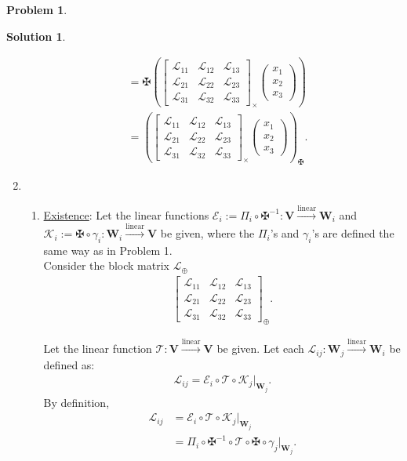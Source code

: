 \documentclass{article}
\theoremstyle{definition}
\newtheorem*{prob*}{Problem}
\newtheorem*{sln*}{Solution}
\newcommand{\V}{\mathbf{V}}
\newcommand{\W}{\mathbf{W}}
\newcommand{\lag}{\mathcal{L}}
\newcommand{\K}{\mathcal{K}}
\newcommand{\E}{\mathcal{E}}
\newcommand{\lin}{\overset{\text{linear}}{\longrightarrow}}
\newcommand{\T}{\mathcal{T}}
\begin{document}
\begin{prob*}
\begin{sln*}
\begin{enumerate}
\begin{align*}
			&=
			\maltese\left(\begin{bmatrix}
			\lag_{11} & \lag_{12} & \lag_{13}\\
			\lag_{21} & \lag_{22} & \lag_{23}\\
			\lag_{31} & \lag_{32} & \lag_{33}
			\end{bmatrix}_\times \begin{pmatrix}
			x_1\\x_2\\x_3
			\end{pmatrix}\right)\\
			&= 
			\left( \begin{bmatrix}
			\lag_{11} & \lag_{12} & \lag_{13}\\
			\lag_{21} & \lag_{22} & \lag_{23}\\
			\lag_{31} & \lag_{32} & \lag_{33}
			\end{bmatrix}_\times \begin{pmatrix}
			x_1\\x_2\\x_3
			\end{pmatrix}   \right)_{\maltese}.
			\end{align*}
						
						
			
			\item 
			\begin{enumerate}
				\item \underline{Existence}: Let the linear functions $\E_i := \Pi_i \circ \maltese^{-1} : \V \lin \W_i$ and $\K_i := \maltese\circ \gamma_i : \W_i \lin \V$ be given, where the $\Pi_i$'s and $\gamma_i$'s are defined the same way as in Problem 1. \\
				
				Consider the block matrix $\lag_\oplus$
				\begin{align*}
				\begin{bmatrix}
				\lag_{11} & \lag_{12} & \lag_{13}\\
				\lag_{21} & \lag_{22} & \lag_{23}\\
				\lag_{31} & \lag_{32} & \lag_{33}
				\end{bmatrix}_\oplus.
				\end{align*}
				
				Let the linear function $\T : \V \lin \V$ be given. Let each $\lag_{ij} : \W_j \lin \W_i$ be defined as:
				\begin{align*}
				\lag_{ij} = \E_i \circ \T \circ \K_j \bigg\vert_{\W_j}.
				\end{align*}
				By definition,
				\begin{align*}
				\lag_{ij} &= \E_i \circ \T \circ \K_j \bigg\vert_{\W_j}\\
				&= \Pi_i \circ \maltese^{-1} \circ \T \circ \maltese\circ \gamma_j\bigg\vert_{\W_j}.
				\end{align*}
				

\end{enumerate}
\end{enumerate}
\end{sln*}
\end{prob*}
\end{document}
